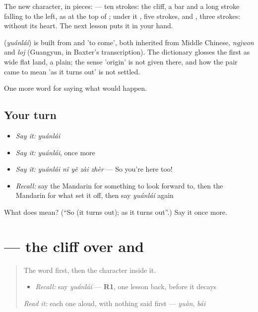 The new character, in pieces:  — ten strokes: the cliff, a bar and a long stroke falling to the left, as at the top of ; under it , five strokes, and , three strokes:  without its heart. The next lesson puts it in your hand.

\begin{cousinweb}
\textbf{} (\emph{yuánlái}) is built from  and  'to come', both inherited from Middle Chinese, \emph{ngjwon} and \emph{loj} (Guangyun, in Baxter's transcription). The dictionary glosses the first as wide flat land, a plain; the sense 'origin' is not given there, and how the pair came to mean 'as it turns out' is not settled.
\end{cousinweb}

\begin{grammarlens}[title={What you've built}]
One more word for saying what would happen.
\end{grammarlens}

\subsection*{Your turn}
\begin{itemize}
\raggedright
  \item \emph{Say it:} \emph{yuánlái}
  \item \emph{Say it:} \emph{yuánlái}, once more
  \item \emph{Say it:} \emph{yuánlái nǐ yě zài zhèr} — So you're here too!
  \item \emph{Recall:} say the Mandarin for something to look forward to, then the Mandarin for what set it off, then say \emph{yuánlái} again
\end{itemize}

\begin{tcolorbox}[breakable,colback=teal!4,colframe=teal!35!black,title={Before you move on}]
What does  mean? (\textquotedblleft{}So (it turns out); as it turns out\textquotedblright{}.) Say it once more.
\end{tcolorbox}
\section[\texorpdfstring{\zh{原} (yuán)}{原 (yuán)}]{ — the cliff over  and }

\label{lesson:ZH-W537-yuan-origin}



\begin{quote}
The word first, then the character inside it.

\begin{itemize}
\raggedright
  \item \emph{Recall:} say \emph{yuánlái} — \textbf{R1}, one lesson back, before it decays
\end{itemize}

\begin{quote}
 
\end{quote}

\emph{Read it:} each one aloud, with nothing said first — \emph{yuàn}, \emph{bái}
\end{quote}

